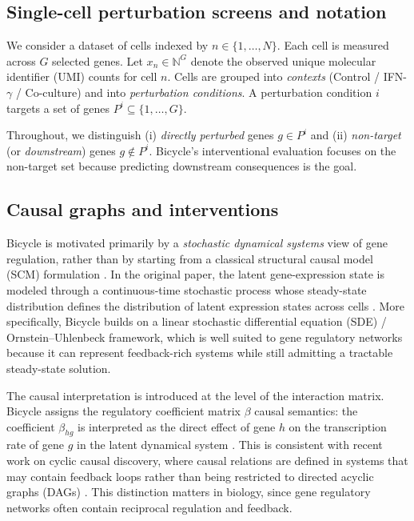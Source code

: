 \documentclass[12pt]{article}
\begin{document}
\subsection{Single-cell perturbation screens and notation}
We consider a dataset of cells indexed by \(n \in \{1,\dots,N\}\). Each cell is measured across \(G\)
selected genes. Let \(x_n \in \mathbb{N}^G\) denote the observed unique molecular identifier (UMI) counts for cell \(n\). Cells are
grouped into \emph{contexts} (Control / IFN-\(\gamma\) / Co-culture) and into \emph{perturbation
conditions}. A perturbation condition \(i\) targets a set of genes \(P^i \subseteq \{1,\dots,G\}\).

Throughout, we distinguish (i) \emph{directly perturbed} genes \(g \in P^i\) and (ii) \emph{non-target}
(or \emph{downstream}) genes \(g \notin P^i\). Bicycle’s interventional evaluation focuses on the
non-target set because predicting downstream consequences is the goal.

\subsection{Causal graphs and interventions}
Bicycle is motivated primarily by a \emph{stochastic dynamical systems} view of gene regulation, rather than by starting from a classical structural causal model (SCM) formulation \cite{pearl2009causality}. In the original paper, the latent gene-expression state is modeled through a continuous-time stochastic process whose steady-state distribution defines the distribution of latent expression states across cells \cite{rohbeck2024bicycle}. More specifically, Bicycle builds on a linear stochastic differential equation (SDE) / Ornstein--Uhlenbeck framework, which is well suited to gene regulatory networks because it can represent feedback-rich systems while still admitting a tractable steady-state solution.

The causal interpretation is introduced at the level of the interaction matrix. Bicycle assigns the regulatory coefficient matrix \(\beta\) causal semantics: the coefficient \(\beta_{hg}\) is interpreted as the direct effect of gene \(h\) on the transcription rate of gene \(g\) in the latent dynamical system \cite{rohbeck2024bicycle}. This is consistent with recent work on cyclic causal discovery, where causal relations are defined in systems that may contain feedback loops rather than being restricted to directed acyclic graphs (DAGs) \cite{bongers2021theoretical}. This distinction matters in biology, since gene regulatory networks often contain reciprocal regulation and feedback.
\end{document}
